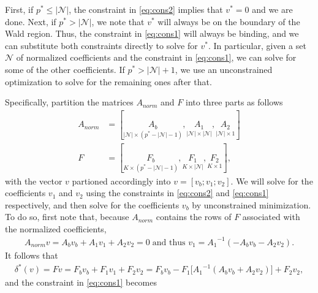 \documentclass[12pt]{article}
\begin{document}
First, if $p^* \le |\mathcal{N}|$, the constraint in \eqref{eq:cons2} implies that $v^*=0$ and we are done.
Next, if $p^* > |\mathcal{N}|$, we note that $v^*$ will always be on the boundary of the Wald region.
Thus, the constraint in \eqref{eq:cons1} will always be binding, and we can substitute both constraints directly to solve for $v^*$.
In particular, given a set $\mathcal{N}$ of normalized coefficients and the constraint in \eqref{eq:cons1}, we can solve for some of the other coefficients.
If $p^* > |\mathcal{N}|+1$, we use an unconstrained optimization to solve for the remaining ones after that.

Specifically, partition the matrices $A_{norm}$ and $F$ into three parts as follows
\begin{align*}
A_{norm} &= [ \underset{|\mathcal{N}| \times (p^* - |\mathcal{N}| - 1)}{A_b}, \underset{|\mathcal{N}| \times |\mathcal{N}|}{A_1}, \underset{|\mathcal{N}| \times 1}{A_2}] \\
F &= [\underset{K \times  (p^* - |\mathcal{N}| -1) }{F_b},\underset{K \times |\mathcal{N}| }{F_1},\underset{K \times 1}{F_2}],
\end{align*}
with the vector $v$ partioned accordingly into $v=[v_b; v_1; v_2]$.
We will solve for the coefficients $v_1$ and $v_2$ using the constraints in \eqref{eq:cons2} and \eqref{eq:cons1} respectively, and then solve for the coefficients $v_b$ by unconstrained minimization.
To do so, first note that, because $A_{norm}$ contains the rows of $F$ associated with the normalized coefficients,
\begin{align}
A_{norm}v =  A_b v_b + A_1 v_1 + A_2 v_2 = 0 \;\text{and thus }v_1 = {A_1}^{-1}(- A_b v_b - A_2 v_2).\label{eq:def_v1}
\end{align}
It follows that
\begin{align*}
\delta^*(v)= Fv = F_b v_b + F_1 v_1 + F_2 v_2 = F_b v_b - F_1 \big[ {A_1}^{-1}( A_b v_b + A_2 v_2)\big] + F_2 v_2,
\end{align*}
and the constraint in \eqref{eq:cons1} becomes
\end{document}
